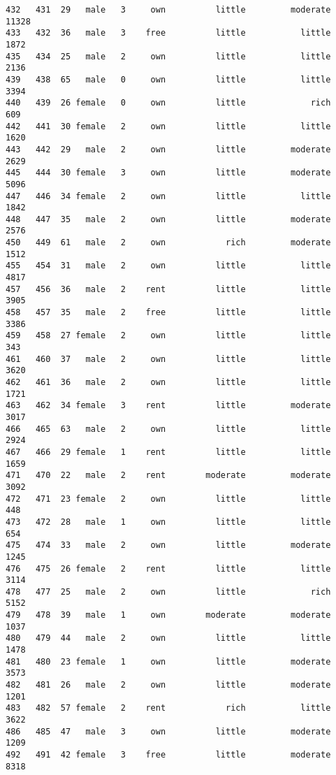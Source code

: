 \documentclass[
]{article}
\begin{document}
\begin{verbatim}
432   431  29   male   3     own          little         moderate         11328
433   432  36   male   3    free          little           little          1872
435   434  25   male   2     own          little           little          2136
439   438  65   male   0     own          little           little          3394
440   439  26 female   0     own          little             rich           609
442   441  30 female   2     own          little           little          1620
443   442  29   male   2     own          little         moderate          2629
445   444  30 female   3     own          little         moderate          5096
447   446  34 female   2     own          little           little          1842
448   447  35   male   2     own          little         moderate          2576
450   449  61   male   2     own            rich         moderate          1512
455   454  31   male   2     own          little           little          4817
457   456  36   male   2    rent          little           little          3905
458   457  35   male   2    free          little           little          3386
459   458  27 female   2     own          little           little           343
461   460  37   male   2     own          little           little          3620
462   461  36   male   2     own          little           little          1721
463   462  34 female   3    rent          little         moderate          3017
466   465  63   male   2     own          little           little          2924
467   466  29 female   1    rent          little           little          1659
471   470  22   male   2    rent        moderate         moderate          3092
472   471  23 female   2     own          little           little           448
473   472  28   male   1     own          little           little           654
475   474  33   male   2     own          little         moderate          1245
476   475  26 female   2    rent          little           little          3114
478   477  25   male   2     own          little             rich          5152
479   478  39   male   1     own        moderate         moderate          1037
480   479  44   male   2     own          little           little          1478
481   480  23 female   1     own          little         moderate          3573
482   481  26   male   2     own          little         moderate          1201
483   482  57 female   2    rent            rich           little          3622
486   485  47   male   3     own          little         moderate          1209
492   491  42 female   3    free          little         moderate          8318

\end{verbatim}
\end{document}
